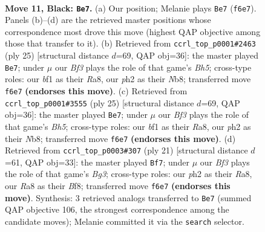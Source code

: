 \documentclass[11pt]{article}
\begin{document}
\begin{figure}[p]
\label{fig:thought-m19}
\end{figure}

\clearpage

\begin{figure}[p]\centering
\begin{subfigure}{0.46\textwidth}\centering
\resizebox{\linewidth}{!}{%
\newchessgame
\chessboard[
  setfen={rnbqk2r/pp3ppp/2p2b2/3p2P1/P2P1P2/2N1P3/1P5P/R2QKBNR b KQkq - 0 11},
  showmover=false,
  pgfstyle=straightmove, color=movearrow, markmove={f6-e7}
]}
\caption{}
\end{subfigure}\hfill
\begin{subfigure}{0.46\textwidth}\centering
\resizebox{\linewidth}{!}{%
\newchessgame
\chessboard[
  setfen={rn1qk2r/1p3pp1/p2p4/3Ppb1p/7b/1N2BPP1/PPPQB2P/R3K2R b KQkq - 0 13},
  showmover=false,
  pgfstyle=straightmove, color=movearrow, markmove={h4-e7}
]}
\caption{}
\end{subfigure}
\\[4pt]
\begin{subfigure}{0.46\textwidth}\centering
\resizebox{\linewidth}{!}{%
\newchessgame
\chessboard[
  setfen={rn1qk2r/1p3pp1/p2p4/3Ppb1p/7b/1N2BPP1/PPPQB2P/R3K2R b KQkq - 0 13},
  showmover=false,
  pgfstyle=straightmove, color=movearrow, markmove={h4-e7}
]}
\caption{}
\end{subfigure}\hfill
\begin{subfigure}{0.46\textwidth}\centering
\resizebox{\linewidth}{!}{%
\newchessgame
\chessboard[
  setfen={r2qkbnr/p5pp/2p1ppb1/3p3P/3P2P1/2N5/PPP2P2/R1BQKB1R b KQkq - 0 11},
  showmover=false,
  pgfstyle=straightmove, color=movearrow, markmove={g6-f7}
]}
\caption{}
\end{subfigure}
\caption{\textbf{Move 11, Black: \texttt{Be7}.} (a) Our position; Melanie plays \texttt{Be7} (\texttt{f6e7}). Panels (b)--(d) are the retrieved master positions whose correspondence most drove this move (highest QAP objective among those that transfer to it). (b) Retrieved from \texttt{ccrl\_top\_p0001\#2463} (ply 25) [structural distance $d$=69, QAP obj=36]: the master played \texttt{Be7}; under $\mu$ our \emph{Bf3} plays the role of that game's \emph{Bh5}; cross-type roles: our \emph{b}f1 as their \emph{R}a8, our \emph{p}h2 as their \emph{N}b8; transferred move \texttt{f6e7} \textbf{(endorses this move)}. (c) Retrieved from \texttt{ccrl\_top\_p0001\#3555} (ply 25) [structural distance $d$=69, QAP obj=36]: the master played \texttt{Be7}; under $\mu$ our \emph{Bf3} plays the role of that game's \emph{Bh5}; cross-type roles: our \emph{b}f1 as their \emph{R}a8, our \emph{p}h2 as their \emph{N}b8; transferred move \texttt{f6e7} \textbf{(endorses this move)}. (d) Retrieved from \texttt{ccrl\_top\_p0003\#307} (ply 21) [structural distance $d$=61, QAP obj=33]: the master played \texttt{Bf7}; under $\mu$ our \emph{Bf3} plays the role of that game's \emph{Bg3}; cross-type roles: our \emph{p}h2 as their \emph{R}a8, our \emph{R}a8 as their \emph{B}f8; transferred move \texttt{f6e7} \textbf{(endorses this move)}. Synthesis: 3 retrieved analogs transferred to \texttt{Be7} (summed QAP objective 106, the strongest correspondence among the candidate moves); Melanie committed it via the \texttt{search} selector.}

\end{figure}
\end{document}
